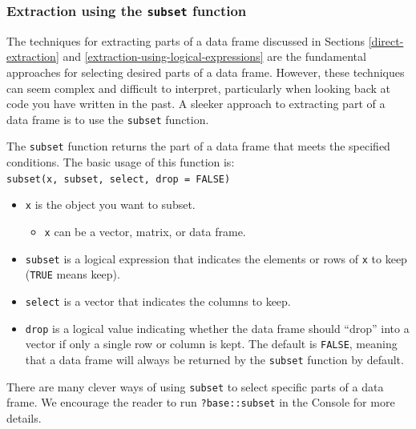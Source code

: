 \documentclass[
]{book}
\providecommand{\tightlist}{%
  \setlength{\itemsep}{0pt}\setlength{\parskip}{0pt}}
\theoremstyle{definition}
\theoremstyle{definition}
\theoremstyle{definition}
\theoremstyle{definition}
\theoremstyle{remark}
\begin{document}
\hypertarget{extraction-using-the-subset-function}{%
\subsubsection{\texorpdfstring{Extraction using the \texttt{subset} function}{Extraction using the subset function}}\label{extraction-using-the-subset-function}}

The techniques for extracting parts of a data frame discussed in Sections \ref{direct-extraction} and \ref{extraction-using-logical-expressions} are the fundamental approaches for selecting desired parts of a data frame. However, these techniques can seem complex and difficult to interpret, particularly when looking back at code you have written in the past. A sleeker approach to extracting part of a data frame is to use the \texttt{subset} function.

The \texttt{subset} function returns the part of a data frame that meets the specified conditions. The basic usage of this function is: \texttt{subset(x,\ subset,\ select,\ drop\ =\ FALSE)}

\begin{itemize}
\tightlist
\item
  \texttt{x} is the object you want to subset.

  \begin{itemize}
  \tightlist
  \item
    \texttt{x} can be a vector, matrix, or data frame.
  \end{itemize}
\item
  \texttt{subset} is a logical expression that indicates the elements or rows of \texttt{x} to keep (\texttt{TRUE} means keep).
\item
  \texttt{select} is a vector that indicates the columns to keep.
\item
  \texttt{drop} is a logical value indicating whether the data frame should ``drop'' into a vector if only a single row or column is kept. The default is \texttt{FALSE}, meaning that a data frame will always be returned by the \texttt{subset} function by default.
\end{itemize}

There are many clever ways of using \texttt{subset} to select specific parts of a data frame. We encourage the reader to run \texttt{?base::subset} in the Console for more details.
\end{document}
